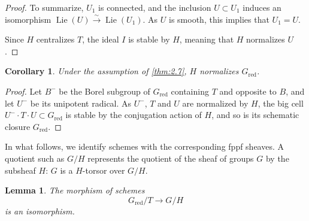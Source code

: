 \documentclass[11pt,a4paper]{article}
\theoremstyle{plain}
\newtheorem{lemma}[theorem]{Lemma}
\newtheorem{corollary}[theorem]{Corollary}
\theoremstyle{definition}
\DeclareMathOperator{\Lie}{Lie}
\newcommand{\red}{\mathrm{red}}
\begin{document}
\begin{proof}
To summarize, $U_1$ is connected, and the inclusion $U \subset U_1$ induces an isomorphism $\Lie(U) \xrightarrow{\sim} \Lie(U_1)$. As $U$ is smooth, this implies that $U_1 = U$.

Since $H$ centralizes $T$, the ideal $I$ is stable by $H$, meaning that $H$ normalizes $U$. \qedhere
\end{proof}

\begin{corollary} \label{cor:2.13}
Under the assumption of \ref{thm:2.7}, $H$ normalizes $G_\red$.
\end{corollary}

\begin{proof}
Let $B^-$ be the Borel subgroup of $G_\red$ containing $T$ and opposite to $B$, and let $U^-$ be its unipotent radical. As $U^-$, $T$ and $U$ are normalized by $H$, the big cell $U^- \cdot T \cdot U \subset G_\red$ is stable by the conjugation action of $H$, and so is its schematic closure $G_\red$. \qedhere
\end{proof}

In what follows, we identify schemes with the corresponding fppf sheaves. A quotient such as $G/H$ represents the quotient of the sheaf of groups $G$ by the subsheaf $H$: $G$ is a $H$-torsor over $G/H$.

\begin{lemma} \label{lem:2.14}
The morphism of schemes
\begin{equation} \label{eq:2.14.1}
G_\red/T \to G/H
\end{equation}
is an isomorphism.
\end{lemma}
\end{document}
